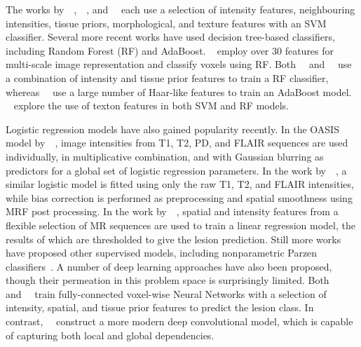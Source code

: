 The works by~\citeauthor{Lao2006}~\cite{Lao2006},~\citeauthor{Abdullah2012}~\cite{Abdullah2012}, and~\citeauthor{Scully2010}~\cite{Scully2010} each use a selection of intensity features, neighbouring intensities, tissue priors, morphological, and texture features with an SVM classifier.
Several more recent works have used decision tree-based classifiers, including Random Forest (RF) and AdaBoost.
\citeauthor{Akselrod-Ballin2009}~\cite{Akselrod-Ballin2009} employ over 30 features for multi-scale image representation and classify voxels using RF\@.
Both~\citeauthor{Geremia2011}~\cite{Geremia2011} and~\citeauthor{Roy2015}~\cite{Roy2015} use a combination of intensity and tissue prior features to train a RF classifier, whereas~\citeauthor{Wels2008}~\cite{Wels2008} use a large number of Haar-like features to train an AdaBoost model.
\citeauthor{Ithapu2014}~\cite{Ithapu2014} explore the use of texton features in both SVM and RF models.
\par
Logistic regression models have also gained popularity recently.
In the OASIS model by~\citeauthor{Sweeney2013}~\cite{Sweeney2013}, image intensities from T1, T2, PD, and FLAIR sequences are used individually, in multiplicative combination, and with Gaussian blurring as predictors for a global set of logistic regression parameters.
In the work by~\citeauthor{Zhan2017}~\cite{Zhan2017}, a similar logistic model is fitted using only the raw T1, T2, and FLAIR intensities, while bias correction is performed as preprocessing and spatial smoothness using MRF post processing.
In the work by~\citeauthor{Dadar2017}~\cite{Dadar2017}, spatial and intensity features from a flexible selection of MR sequences are used to train a linear regression model, the results of which are thresholded to give the lesion prediction.
Still more works have proposed other supervised models, including nonparametric Parzen classifiers~\cite{Sajja2006}.
A number of deep learning approaches have also been proposed, though their permeation in this problem space is surprisingly limited.
Both~\citeauthor{Zijdenbos2002}~\cite{Zijdenbos2002} and~\citeauthor{Dyrby2008}~\cite{Dyrby2008} train fully-connected voxel-wise Neural Networks with a selection of intensity, spatial, and tissue prior features to predict the lesion class.
In contrast,~\citeauthor{Brosch2015}~\cite{Brosch2015} construct a more modern deep convolutional model, which is capable of capturing both local and global dependencies.
